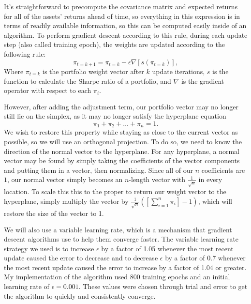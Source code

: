\documentclass{article}
\begin{document}
It’s straightforward to precompute the covariance matrix and expected returns for all of the assets’ returns ahead of time, so everything in this expression is in terms of readily available information, so this can be computed easily inside of an algorithm.
To perform gradient descent according to this rule, during each update step (also called training epoch), the weights are updated according to the following rule:
\[\pi_{t=k+1} = \pi_{t=k} - \epsilon\nabla [s(\pi_{t=k})],\]
Where $\pi_{t=k}$ is the portfolio weight vector after $k$ update iterations, $s$ is the function to calculate the Sharpe ratio of a portfolio, and $\nabla$ is the gradient operator with respect to each $\pi_i$.

However, after adding the adjustment term, our portfolio vector may no longer still lie on the simplex, as it may no longer satisfy the hyperplane equation
\[\pi_1 + \pi_2 + \dots + \pi_n = 1.\]
We wish to restore this property while staying as close to the current vector as possible, so we will use an orthogonal projection.  
To do so, we need to know the direction of the normal vector to the hyperplane.  For any hyperplane, a normal vector may be found by simply taking the coefficients of the vector components and putting them in a vector, then normalizing.  
Since all of our $n$ coefficients are $1$, our normal vector simply becomes an $n$-length vector with $\frac{1}{\sqrt{n}}$ in every location.  To scale this this to the proper to return our weight vector to the hyperplane, simply multiply the vector by $\frac{1}{\sqrt{n}}([\sum_{i=1}^n \pi_i] - 1)$, which will restore the size of the vector to 1.

We will also use a variable learning rate, which is a mechanism that gradient descent algorithms use to help them converge faster. 
The variable learning rate strategy we used is to increase $\epsilon$ by a factor of 1.05 whenever the most recent update caused the error to decrease and to decrease $\epsilon$ by a factor of 0.7 whenever the most recent update caused the error to increase by a factor of 1.04 or greater. 
My implementation of the algorithm used 800 training epochs and an initial learning rate of $\epsilon = 0.001$. These values were chosen through trial and error to get the algorithm to quickly and consistently converge.
\end{document}
